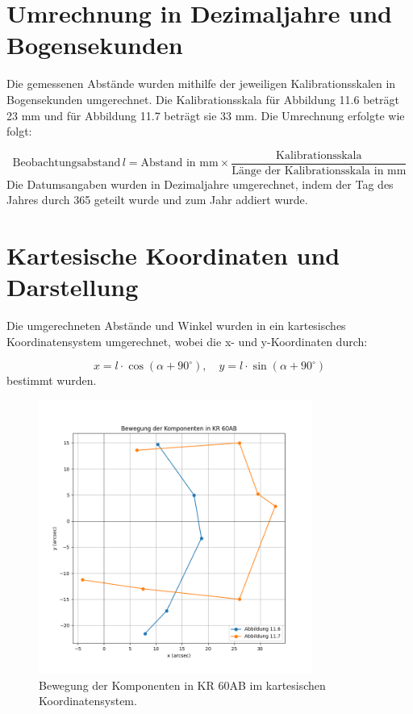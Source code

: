 \documentclass[a4paper,12pt]{article}
\begin{document}
\section*{Umrechnung in Dezimaljahre und Bogensekunden}

Die gemessenen Abstände wurden mithilfe der jeweiligen Kalibrationsskalen in Bogensekunden umgerechnet. Die Kalibrationsskala für Abbildung 11.6 beträgt 23 mm und für Abbildung 11.7 beträgt sie 33 mm. Die Umrechnung erfolgte wie folgt:

\[
\text{Beobachtungsabstand} \, l = \text{Abstand in mm} \times \frac{\text{Kalibrationsskala}}{\text{Länge der Kalibrationsskala in mm}}
\]
Die Datumsangaben wurden in Dezimaljahre umgerechnet, indem der Tag des Jahres durch 365 geteilt wurde und zum Jahr addiert wurde.

\section*{Kartesische Koordinaten und Darstellung}

Die umgerechneten Abstände und Winkel wurden in ein kartesisches Koordinatensystem umgerechnet, wobei die x- und y-Koordinaten durch:

\[
x = l \cdot \cos(\alpha + 90^\circ), \quad y = l \cdot \sin(\alpha + 90^\circ)
\]
bestimmt wurden.

\begin{figure}[H]
    \centering
    \includegraphics[width=0.8\textwidth]{bewegung_kr60ab.png}
    \caption{Bewegung der Komponenten in KR 60AB im kartesischen Koordinatensystem.}
    \label{fig:bewegung_kr60ab}
\end{figure}
\end{document}
